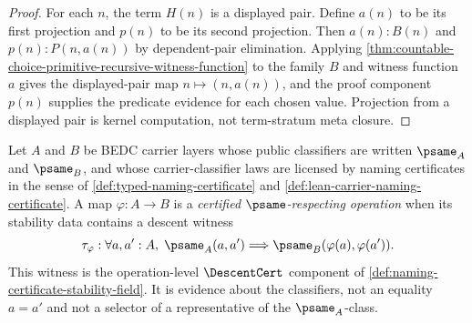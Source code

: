 \begin{proof}
For each $n$, the term $H(n)$ is a displayed pair. Define $a(n)$ to be its first projection and $p(n)$ to be its second projection. Then $a(n):B(n)$ and $p(n):P(n,a(n))$ by dependent-pair elimination. Applying \autoref{thm:countable-choice-primitive-recursive-witness-function} to the family $B$ and witness function $a$ gives the displayed-pair map $n\mapsto(n,a(n))$, and the proof component $p(n)$ supplies the predicate evidence for each chosen value. Projection from a displayed pair is kernel computation, not term-stratum meta closure.
\end{proof}

\begin{definition}
\label{def:namecert-psame-respecting-operation}
Let $A$ and $B$ be BEDC carrier layers whose public classifiers are written $\psame_A$ and $\psame_B$, and whose carrier-classifier laws are licensed by naming certificates in the sense of \autoref{def:typed-naming-certificate} and \autoref{def:lean-carrier-naming-certificate}. A map $\varphi:A\to B$ is a \emph{certified $\psame$-respecting operation} when its stability data contains a descent witness
$$
\tau_\varphi:\forall a,a':A,\; \psame_A(a,a')\Longrightarrow \psame_B(\varphi(a),\varphi(a')).
$$
This witness is the operation-level $\DescentCert$ component of \autoref{def:naming-certificate-stability-field}. It is evidence about the classifiers, not an equality $a=a'$ and not a selector of a representative of the $\psame_A$-class.
\end{definition}

